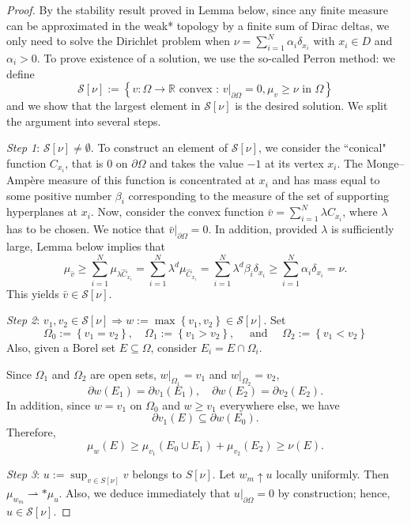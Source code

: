 \documentclass[twoside, 12pt]{book}
\numberwithin{equation}{chapter}
\def\cS{{\mathcal S}}
\def\geq{\geqslant}
\def\p{\partial}
\begin{document}
	\begin{proof}
		By the stability result proved in Lemma below, since any finite measure can be approximated in the weak*
		topology by a finite sum of Dirac deltas, we only need to
		solve the Dirichlet problem  when $\nu=\sum_{i=1}^N \alpha_i \delta_{x_i}$ with $x_i\in D$ and $\alpha_i>0$. To prove existence of a solution, we use the so-called Perron method: we define 
		$$
		\mathcal{S}[\nu]:=\left\{v: \Omega \rightarrow \mathbb{R} \text { convex : }\left.v\right|_{\partial \Omega}=0, \mu_v \geq \nu \text { in } \Omega\right\}
		$$
		and we show that the largest element in $\cS[\nu]$ is the desired solution. We split the argument into several steps.
		
		{\em Step 1}: $\cS[\nu]\neq \emptyset$. To construct an element of $\cS[\nu]$, we consider the ``conical" function $C_{x_i}$, that is $0$ on $\p\Omega$ and takes the value $-1$ at its vertex $x_i$. The Monge–Ampère measure of this function is concentrated at $x_i$ and has mass equal
		to some positive number $\beta_i$ corresponding to the measure of the set of supporting hyperplanes at $x_i$. Now, consider the convex function $\bar v=\sum_{i=1}^N \lambda C_{x_i}$, where $\lambda$ has to be chosen.
		We notice that $\bar v|_{\p \Omega}=0$. In addition, provided $\lambda$ is sufficiently large, Lemma below  
		implies that 
		$$
		\mu_{\bar{v}} \geq \sum_{i=1}^N \mu_{\lambda \hat{C}_{x_i}}=\sum_{i=1}^N \lambda^d \mu_{\hat{C}_{x_i}}=\sum_{i=1}^N \lambda^d \beta_i \delta_{x_i} \geq \sum_{i=1}^N \alpha_i \delta_{x_i} = \nu.
		$$
		This yields $\bar v\in \cS[\nu]$. 
		
		{\em Step 2}: $v_1, v_2 \in \mathcal{S}[\nu] \Rightarrow w:=\max \left\{v_1, v_2\right\} \in \mathcal{S}[\nu]$. Set 
		$$
		\Omega_0:=\left\{v_1=v_2\right\}, \quad \Omega_1:=\left\{v_1>v_2\right\}, \quad \text { and } \quad \Omega_2:=\left\{v_1<v_2\right\}
		$$
		Also, given a Borel set $E\subseteq \Omega$, consider $E_i= E\cap \Omega_i$. 
		
		Since $\Omega_1$ and $\Omega_2$ are open sets, $w|_{\Omega_1}=v_1$ and $w|_{\Omega_2}=v_2$, 
		$$
		\p w(E_1) = \p v_1(E_1), \quad   \p w(E_2) = \p v_2(E_2). 
		$$
		In addition, since $w=v_1$ on $\Omega_0$ and $w\geq v_1$ everywhere else, we have 
		$$
		\p v_1(E) \subseteq \p w(E_0). 
		$$
		Therefore, 
		$$
		\mu_w (E) \geq \mu_{v_1}(E_0\cup E_1)+ \mu_{v_2} (E_2) \geq \nu(E).  
		$$
		
		{\em Step 3}: $u:=\sup _{v \in S[\nu]} v$  belongs to  $S[\nu]$. Let $w_m \uparrow u$ locally uniformly. Then $\mu_{w_m} \rightharpoonup*\mu_u$.  Also, we deduce
		immediately that $u|_{\p\Omega}=0$ by construction;  hence, $u\in \cS[\nu]$. 
		

\end{proof}
\end{document}
